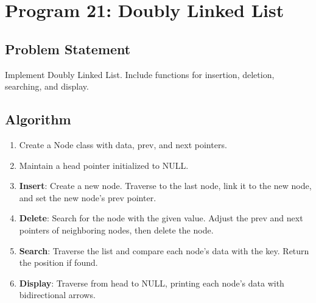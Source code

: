 \documentclass[a4paper,12pt]{article}
\begin{document}
\newpage

\section*{Program 21: Doubly Linked List}

\subsection*{Problem Statement}
Implement Doubly Linked List. Include functions for insertion, deletion, searching, and display.

\subsection*{Algorithm}
\begin{enumerate}
    \item Create a Node class with data, prev, and next pointers.
    \item Maintain a head pointer initialized to NULL.
    \item \textbf{Insert}: Create a new node. Traverse to the last node, link it to the new node, and set the new node's prev pointer.
    \item \textbf{Delete}: Search for the node with the given value. Adjust the prev and next pointers of neighboring nodes, then delete the node.
    \item \textbf{Search}: Traverse the list and compare each node's data with the key. Return the position if found.
    \item \textbf{Display}: Traverse from head to NULL, printing each node's data with bidirectional arrows.
\end{enumerate}
\end{document}
